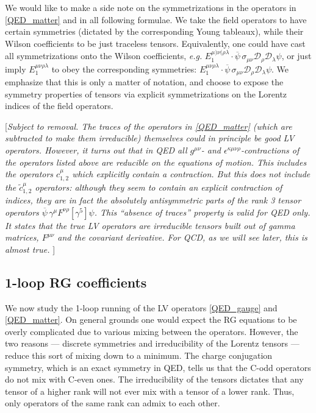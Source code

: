 \documentclass[12pt]{revtex4}
\newcommand{\wt}{\widetilde}
\newcommand{\ov}{\overline}
\begin{document}
	We would like to make a side note on the symmetrizations in the 
	operators in \eqref{QED_matter} and in all following formulae.
	We take the field operators to have certain symmetries 
	(dictated by the corresponding Young tableaux), while their Wilson
	coefficients to be just traceless tensors. 
	Equivalently, one could have cast all symmetrizations onto the
	Wilson coefficients, {\it e.g.}
$	E_1^{\mu)\nu(\rho\lambda}\cdot
	\ov{\psi}\, \sigma_{\mu\nu} \mathcal{D}_{\rho}\mathcal{D}_\lambda 
	\psi $,
	or just imply $ E_1^{\mu\nu\rho\lambda} $ to obey the corresponding
	symmetries: 
$	E_1^{\mu\nu\rho\lambda}\cdot
	\ov{\psi}\, \sigma_{\mu\nu} \mathcal{D}_{\rho}\mathcal{D}_\lambda 
	\psi $.
	We emphasize that this is only a matter of notation, and choose
	to expose the symmetry properties of tensors via explicit 
	symmetrizations on the Lorentz indices of the field operators.

	[{\it Subject to removal. 
	The traces of the operators in \eqref{QED_matter} (which are subtracted
	to make them irreducible) themselves could in principle be
	good LV operators. 	
	However, it turns out that in QED all $ g^{\mu\nu} $- and
	$ \epsilon^{\kappa\mu\nu\rho} $-contractions of the operators 
	listed above are reducible on the equations of motion. 
	This includes the operators $ c_{1,2}^\mu $ which explicitly
	contain a contraction.
	But this does not
	include the $ \wt{c}_{1,2}^\mu $ operators: although they
	seem to contain an explicit contraction of indices, 
	they are
	in fact 
	the absolutely antisymmetric parts of the rank 3 tensor
	operators $ \ov{\psi}\, \gamma^\mu F^{\nu\rho} [\gamma^5] \psi $.
	This ``absence of traces'' property is valid for QED only.
	It states that the true LV operators are irreducible tensors
	built out of gamma matrices, $ F^{\mu\nu} $ and the covariant
	derivative.
	For QCD, as we will see later, this is almost true.
	}]

\subsection{1-loop RG coefficients}
	We now study the 1-loop running of the LV operators 
	\eqref{QED_gauge} and \eqref{QED_matter}.
	On general grounds one would expect the RG equations to be overly
	complicated due to various mixing between the operators.
	However, the two reasons --- discrete symmetries and irreducibility
	of the Lorentz tensors --- reduce this sort of mixing down to
	a minimum.
	The charge conjugation symmetry, which is an exact symmetry in QED,
	tells us that the C-odd operators do not mix with C-even ones.
	The irreducibility of the tensors dictates that any tensor of
	a higher rank will not ever mix with a tensor of a lower rank.
	Thus, only operators of the same rank can admix to each other.
	
\end{document}
